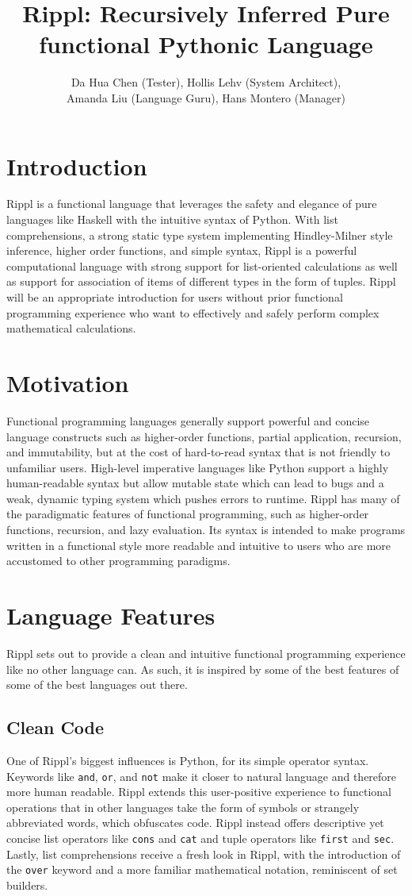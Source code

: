 ﻿\documentclass[5pt]{article}
\title{Rippl: Recursively Inferred Pure functional Pythonic Language}
\author{Da Hua Chen (Tester), Hollis Lehv (System Architect),\\Amanda Liu (Language Guru), Hans Montero (Manager)}
\date{}
\begin{document}
\maketitle

\section{Introduction}
Rippl is a functional language that leverages the safety and elegance of pure languages like Haskell with the intuitive syntax of Python. With list comprehensions, a strong static type system implementing Hindley-Milner style inference, higher order functions, and simple syntax, Rippl is a powerful computational language with strong support for list-oriented calculations as well as support for association of items of different types in the form of tuples. Rippl will be an appropriate introduction for users without prior functional programming experience who want to effectively and safely perform complex mathematical calculations.


\section{Motivation}
Functional programming languages generally support powerful and concise language constructs such as higher-order functions, partial application, recursion, and immutability, but at the cost of hard-to-read syntax that is not friendly to unfamiliar users. High-level imperative languages like Python support a highly human-readable syntax but allow mutable state which can lead to bugs and a weak, dynamic typing system which pushes errors to runtime. Rippl has many of the paradigmatic features of functional programming, such as higher-order functions, recursion, and lazy evaluation. Its syntax is intended to make programs written in a functional style more readable and intuitive to users who are more accustomed  to other programming paradigms.

\pagebreak

\section{Language Features}
Rippl sets out to provide a clean and intuitive functional programming experience like no other language can. As such, it is inspired by some of the best features of some of the best languages out there.
\subsection{Clean Code}
One of Rippl’s biggest influences is Python, for its simple operator syntax.
Keywords like \texttt{and}, \texttt{or}, and \texttt{not} make it closer to
natural language and therefore more human readable. Rippl extends this
user-positive experience to functional operations that in other languages take
the form of symbols or strangely abbreviated words, which obfuscates code. Rippl
instead offers descriptive yet concise list operators like \texttt{cons} and
\texttt{cat} and tuple operators like \texttt{first} and \texttt{sec}. Lastly,
list comprehensions receive a fresh look in Rippl, with the introduction of the
\texttt{over} keyword and a more familiar mathematical notation, reminiscent of set builders.
\end{document}
